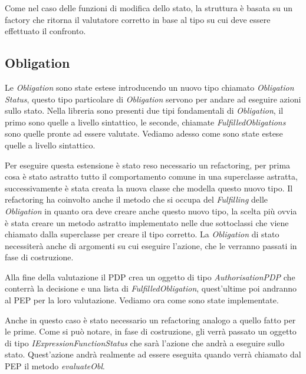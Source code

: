 
Come nel caso delle funzioni di modifica dello stato, la struttura è basata su un factory che ritorna il valutatore corretto in base al tipo su cui deve essere effettuato il confronto.

\subsection{Obligation}
\label{sub:estensione_obligation}
Le \textit{Obligation} sono state estese introducendo un nuovo tipo chiamato \textit{Obligation Status}, questo tipo particolare di \textit{Obligation} servono per andare ad eseguire azioni sullo stato.
Nella libreria sono presenti due tipi fondamentali di \textit{Obligation}, il primo sono quelle a livello sintattico, le seconde, chiamate \textit{FulfilledObligations} sono quelle pronte ad essere valutate. Vediamo adesso come sono state estese quelle a livello sintattico. \par
Per eseguire questa estensione è stato reso necessario un refactoring, per prima cosa è stato astratto tutto il comportamento comune in una superclasse astratta, successivamente è stata creata la nuova classe che modella questo nuovo tipo.
Il refactoring ha coinvolto anche il metodo che si occupa del \textit{Fulfilling} delle \textit{Obligation} in quanto ora deve creare anche questo nuovo tipo, la scelta più ovvia è stata creare un metodo astratto implementato nelle due sottoclassi che viene chiamato dalla superclasse per creare il tipo corretto.
La \textit{Obligation} di stato necessiterà anche di argomenti su cui eseguire l'azione, che le verranno passati in fase di costruzione. \par
Alla fine della valutazione il \ac{PDP} crea un oggetto di tipo \textit{AuthorisationPDP} che conterrà la decisione e una lista di \textit{FulfilledObligation}, quest'ultime poi andranno al \ac{PEP} per la loro valutazione. Vediamo ora come sono state implementate. \par
Anche in questo caso è stato necessario un refactoring analogo a quello fatto per le prime.
Come si può notare, in fase di costruzione, gli verrà passato un oggetto di tipo \textit{IExpressionFunctionStatus} che sarà l'azione che andrà a eseguire sullo stato. Quest'azione andrà realmente ad essere eseguita quando verrà chiamato dal \ac{PEP} il metodo \textit{evaluateObl}. \par
